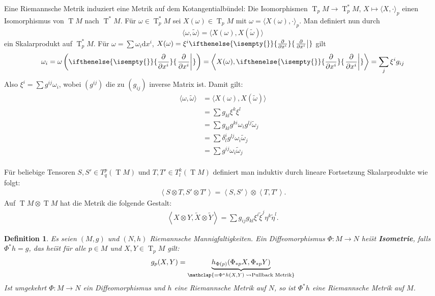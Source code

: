 \documentclass[paper=A4, twoside, chapterprefix=true, bibliography=totoc, headsepline]{scrbook}
\DeclareMathOperator{\T}{T}         %
\newcommand{\dop}{\mathrm{d}}
\newcommand{\pdifffrac}[3][]{\ifthenelse{\isempty{#1}}{\frac{\partial #2}{\partial #3}}{\left. \frac{\partial #2}{\partial #3} \right|_{#1}}}
\theoremstyle{plain}
\newtheorem{Dfn}{Definition}[chapter]
\theoremstyle{nonumberplain}
\theoremstyle{empty}
\theoremstyle{break}
\newcommand{\CmIndex}[2][]{\ifthenelse{\isempty{#1}}{\index{#2}}{\index{#1}}#2}
\newcommand{\CmMark}[2][]{\textbf{\CmIndex[#1]{#2}}}
\begin{document}
Eine Riemannsche Metrik induziert eine Metrik auf dem Kotangentialb\"undel: Die Isomorphismen $\T_pM \to \T_p^*M$, $X \mapsto \langle X, \cdot \rangle_p$ einen Isomorphismus von $\T M$ nach $\T^*M$.
F\"ur $\omega \in \T_p^*M$ sei $X(\omega) \in \T_pM$ mit $\omega = \langle X(\omega), \cdot \rangle_p$.
Man definiert nun durch
\[ \langle \omega, \tilde \omega \rangle = \langle X(\omega), X(\tilde \omega) \rangle \]
ein Skalarprodukt auf $\T_p^*M$. F\"ur $\omega = \sum \omega_i \dop x^{i}$, $X(\omega) = \xi^{i} \pdifffrac{}{x^{i}}$ gilt
\[ \omega_i = \omega \left( \pdifffrac{}{x^{i}} \right) = \left\langle X(\omega), \pdifffrac{}{x^{i}} \right\rangle = \sum_j \xi^{i} g_{ij} \]
Also $\xi^{i} = \sum g^{ij} \omega_i$, wobei $(g^{ij})$ die zu $(g_{ij})$ inverse Matrix ist.
Damit gilt:
\begin{align*}
  \langle \omega, \tilde \omega \rangle &= \langle X(\omega), X(\tilde \omega) \rangle \\
  &= \sum g_{kl} \xi^k \xi^l\\
  &= \sum g_{kl} g^{ki} \omega_i g^{lj} \tilde \omega_j\\
  &= \sum \delta_l^i g^{lj} \omega_i \tilde \omega_j\\
  &= \sum g^{ij} \omega_i \tilde \omega_j\\
\end{align*}



F\"ur beliebige Tensoren $S, S' \in T_q^p(\T M)$ und $T, T' \in T_l^k(\T M)$ definiert man induktiv durch lineare Fortsetzung Skalarprodukte wie folgt:
\begin{align*}
  \left<S \otimes T, S' \otimes T'\right> = \left<S,S'\right> \otimes \left<T,T'\right>.
\end{align*}
Auf $\T M \otimes \T M$ hat die Metrik die folgende Gestalt:
\begin{align*}
  \left<X \otimes Y,\tilde X \otimes \tilde Y\right> = \sum g_{ij}g_{kl}\xi^i\tilde\xi^j\eta^k\tilde\eta^l.
\end{align*}

\begin{Dfn}
  Es seien $(M, g)$ und $(N,h)$ Riemannsche Mannigfaltigkeiten.
Ein Diffeomorphismus $\Phi \colon M \to N$ hei\"st \CmMark{Isometrie}, falls $\Phi^{*}h = g$, das hei\"st f\"ur alle $p \in M$ und $X,Y \in \T_pM$ gilt:
\begin{align*}
  g_p(X,Y) = \underbrace{h_{\Phi(p)}(\Phi_{*p}X,\Phi_{*p}Y)}_{\mathclap{= \Phi^{*}h(X,Y) \; \rightsquigarrow \text{Pullback Metrik}}}
\end{align*}
Ist umgekehrt $\Phi \colon M \to N$ ein Diffeomorphismus und $h$ eine Riemannsche Metrik auf $N$, so ist $\Phi^{*}h$ eine Riemannsche Metrik auf $M$.
\end{Dfn}
\end{document}
